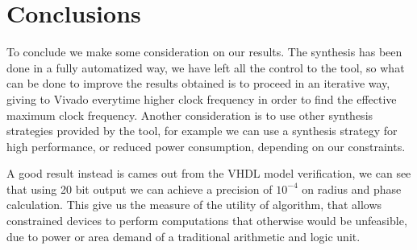 \chapter{Conclusions}\label{ch:conclusions}
To conclude we make some consideration on our results.
The synthesis has been done in a fully automatized way, we have left all the
control to the tool, so what can be done to improve the results obtained is to
proceed in an iterative way, giving to Vivado  everytime higher clock frequency
in order to find the effective maximum clock frequency. Another consideration is
to use other synthesis strategies provided by the tool, for example we can use a
synthesis strategy for high performance, or reduced power consumption, depending
on our constraints. 

A good result instead is cames out from the VHDL model verification, we can see
that using 20 bit output we can achieve a precision of \(10^{-4}\) on radius and
phase calculation. This give us the measure of the utility of \cordic{}
algorithm, that allows constrained devices to perform computations that
otherwise would be unfeasible, due to power or area demand of a traditional
arithmetic and logic unit. 
